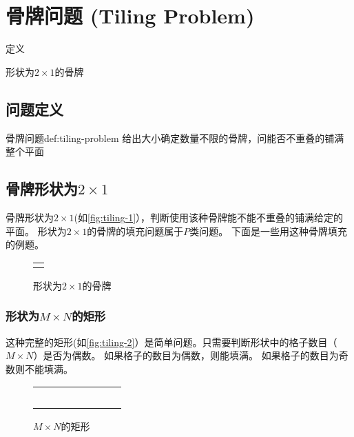 \chapter{骨牌问题 (Tiling Problem)}

\begin{introduction}
    \item 定义
    \item 形状为$2\times1$的骨牌
\end{introduction}

\section{问题定义}\label{sec:tiling-1}
\begin{definition}{骨牌问题}{def:tiling-problem}
    给出大小确定数量不限的骨牌，问能否不重叠的铺满整个平面
\end{definition}

\section{骨牌形状为\texorpdfstring{$2\times1$}{}}\label{sec:tiling-2}
    骨牌形状为$2\times1$(如\autoref{fig:tiling-1}），判断使用该种骨牌能不能不重叠的铺满给定的平面。
    形状为$2\times1$的骨牌的填充问题属于$P$类问题。
    下面是一些用这种骨牌填充的例题。
    \begin{figure}[hbt!]
        \centering
        \begin{tabular}{|c|}
            \hline
            \\ \hline
            \\ \hline
        \end{tabular}
        \caption{形状为$2\times1$的骨牌}
        \label{fig:tiling-1}
    \end{figure}
\subsection{形状为\texorpdfstring{$M\times N$}{}的矩形}\label{subsec:tiling-2-1}
    这种完整的矩形(如\autoref{fig:tiling-2}）是简单问题。只需要判断形状中的格子数目（$M\times N$）是否为偶数。
    如果格子的数目为偶数，则能填满。
    如果格子的数目为奇数则不能填满。
    \begin{figure}[hbt!]
        \centering
        \begin{tabular}{|c|c|c|c@{\dots}c|c|c|c|}
            \cline{1-3} \cline{6-8}
            & & & & & & & \\
            \cline{1-3} \cline{6-8}
            & & & & & & & \\
            \cline{1-3} \cline{6-8}
            \multicolumn{3}{c}{}& &\multicolumn{3}{c}{} \\
            \cline{1-3} \cline{6-8}
            & & & & & & & \\
            \cline{1-3} \cline{6-8}
            & & & & & & & \\
            \cline{1-3} \cline{6-8}
        \end{tabular}
        \caption{$M\times N$的矩形}\label{fig:tiling-2}
    \end{figure}


